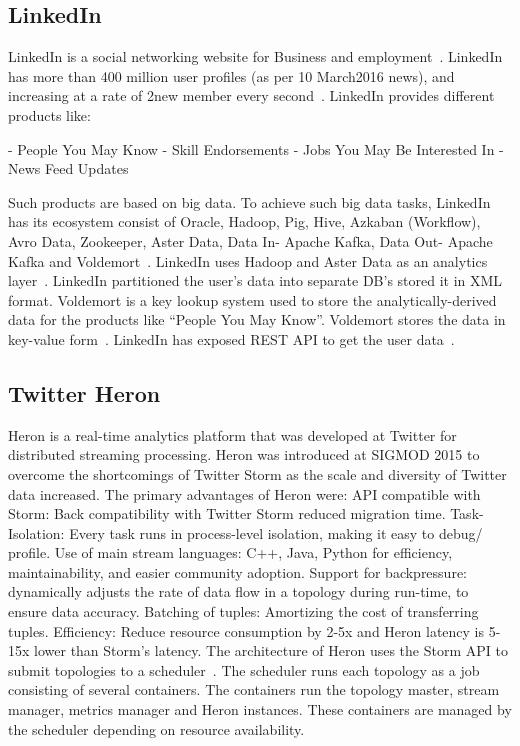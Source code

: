      \pv

\subsection{LinkedIn}
     
LinkedIn is a social networking website for Business and
employment~\cite{www-linkedinwiki}. LinkedIn has more than 400 million
user profiles (as per 10 March2016 news), and increasing at a rate of
2new member every second~\cite{www-linkedinbigdata}.  LinkedIn
provides different products like:

     - People You May Know
     - Skill Endorsements
     - Jobs You May Be Interested In
     - News Feed Updates

     Such products are based on big data. To achieve such big data
     tasks, LinkedIn has its ecosystem consist of Oracle, Hadoop, Pig,
     Hive, Azkaban (Workflow), Avro Data, Zookeeper, Aster Data, Data
     In- Apache Kafka, Data Out- Apache Kafka and
     Voldemort~\cite{www-linkedinbigdata}. LinkedIn uses Hadoop and
     Aster Data as an analytics
     layer~\cite{www-linkedinquora}. LinkedIn partitioned the user’s
     data into separate DB’s stored it in XML format. Voldemort is a
     key lookup system used to store the analytically-derived data for
     the products like ``People You May Know''. Voldemort stores the
     data in key-value form~\cite{www-linkedinquora}. LinkedIn has
     exposed REST API to get the user
     data~\cite{www-linkedindevelopers}.

\subsection{Twitter Heron \cv}

Heron is a real-time analytics platform that was developed at Twitter
for distributed streaming processing. Heron was introduced at SIGMOD
2015 to overcome the shortcomings of Twitter Storm as the scale and
diversity of Twitter data increased.  The primary advantages of Heron
were: API compatible with Storm: Back compatibility with Twitter Storm
reduced migration time\cite{www-TwitterHeronOpen}.  Task-Isolation:
Every task runs in process-level isolation, making it easy to debug/
profile. Use of main stream languages: C++, Java, Python for
efficiency, maintainability, and easier community adoption. Support
for backpressure: dynamically adjusts the rate of data flow in a
topology during run-time, to ensure data accuracy. Batching of tuples:
Amortizing the cost of transferring tuples. Efficiency: Reduce
resource consumption by 2-5x and Heron latency is 5-15x lower than
Storm’s latency. The architecture of Heron uses the Storm API to
submit topologies to a scheduler~\cite{www-TwitterHeron}.  The
scheduler runs each topology as a job consisting of several
containers. The containers run the topology master, stream manager,
metrics manager and Heron instances. These containers are managed by
the scheduler depending on resource availability.

